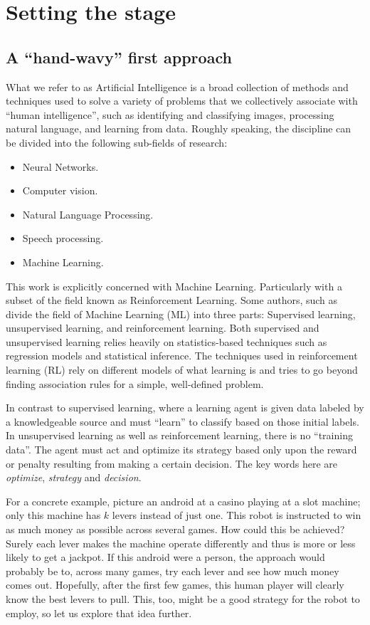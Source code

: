 \chapter{Setting the stage}
\label{chapter:Motivation}
\section{A ``hand-wavy'' first approach}

What we refer to as Artificial Intelligence is a broad collection of methods and
techniques used to solve a variety of problems that we collectively associate
with ``human intelligence'', such as identifying and classifying images, 
processing natural language, and learning from data. Roughly speaking, the
discipline can be divided into the following sub-fields of research:

\begin{itemize}
	\item Neural Networks.
	\item Computer vision.
	\item Natural Language Processing.
	\item Speech processing.
	\item Machine Learning.
\end{itemize}

This work is explicitly concerned with Machine Learning. Particularly with a
subset of the field known as Reinforcement Learning. Some authors, such as
\cite[Ch.~1]{SuttonBarto} divide the field of Machine Learning (ML)
into three parts: Supervised learning, unsupervised learning, and reinforcement 
learning. Both supervised and unsupervised learning relies heavily on
statistics-based techniques such as regression models and statistical inference.
The techniques used in reinforcement learning (RL) rely on different models of
what learning is and tries to go beyond finding association rules for a simple,
well-defined problem.

In contrast to supervised learning, where a learning agent is given data labeled
by a knowledgeable source and must ``learn'' to classify based on those initial
labels. In unsupervised learning as well as reinforcement learning, there is no
``training data''. The agent must act and optimize its strategy based only upon
the reward or penalty resulting from making a certain decision. The key words
here are \textit{optimize},  \textit{strategy} and \textit{decision}.

For a concrete example, picture an android at a casino playing at a slot
machine; only this machine has $k$ levers instead of just one. This robot is
instructed to win as much money as possible across several games. How could this
be achieved? Surely each lever makes the machine operate differently and thus is
more or less likely to get a jackpot.  If this android were a person, the
approach would probably be to, across many games, try each lever and see how
much money comes out. Hopefully, after the first few games, this human player
will clearly know the best levers to pull.  This, too, might be a good strategy
for the robot to employ, so let us explore that idea further.


